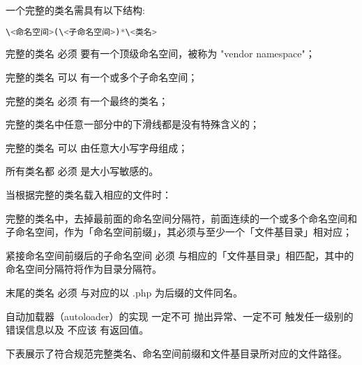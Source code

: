 一个完整的类名需具有以下结构:

\begin{lstlisting}[language=PHP]
\<命名空间>(\<子命名空间>)*\<类名>
\end{lstlisting}

\begin{compactitem}
\item 完整的类名 必须 要有一个顶级命名空间，被称为 "vendor namespace"；

\item 完整的类名 可以 有一个或多个子命名空间；

\item 完整的类名 必须 有一个最终的类名；

\item 完整的类名中任意一部分中的下滑线都是没有特殊含义的；

\item 完整的类名 可以 由任意大小写字母组成；

\item 所有类名都 必须 是大小写敏感的。

\end{compactitem}

当根据完整的类名载入相应的文件时：

\begin{compactitem}
\item 完整的类名中，去掉最前面的命名空间分隔符，前面连续的一个或多个命名空间和子命名空间，作为「命名空间前缀」，其必须与至少一个「文件基目录」相对应；

\item 紧接命名空间前缀后的子命名空间 必须 与相应的「文件基目录」相匹配，其中的命名空间分隔符将作为目录分隔符。

\item 末尾的类名 必须 与对应的以 .php 为后缀的文件同名。

\item 自动加载器（autoloader）的实现 一定不可 抛出异常、一定不可 触发任一级别的错误信息以及 不应该 有返回值。

\end{compactitem}

下表展示了符合规范完整类名、命名空间前缀和文件基目录所对应的文件路径。


